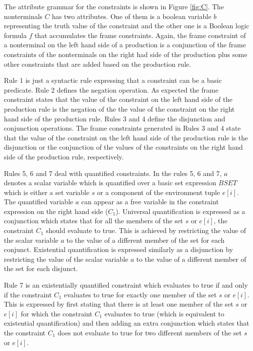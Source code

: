 The attribute grammar for the constraints is shown in
Figure \ref{fig:C}.
The nonterminals $C$ has two attributes.
One of them is a boolean variable $b$ representing
the truth value of the constraint and the other one is a
Boolean logic formula $f$ that accumulates the frame constraints.
Again, the frame constraint of a nonterminal 
on the left hand side of a production
is a conjunction of the frame constraints of the nonterminals
on the right had side of the production plus some other constraints
that are added based on the production rule.

Rule 1 is just a syntactic rule expressing that a constraint can be
a basic predicate.
Rule 2 defines the negation operation. As expected the
frame constraint states that the value of the constraint
on the left hand side of the production rule is the negation of
the the value of the constraint
on the right hand side of the production rule.
Rules 3 and 4 define the disjunction and conjunction operations.
The frame constraints generated in Rules 3 and 4
state that the value of the constraint
on the left hand side of the production rule is the disjunction or
the conjunction of the values of the constraints on the right
hand side of the production rule, respectively.

Rules 5, 6 and 7 deal with quantified constraints.
In the rules 5, 6 and 7, $a$ denotes a scalar variable which is quantified 
over a basic set expression $BSET$ which is either a set variable $s$ or
a component of the environment tuple $e[i]$.
The quantified variable $a$ can appear as a free variable in the constraint
expression on the right hand side ($C_1$).
Universal quantification is expressed as a conjunction which states that
for all the members of the set $s$ or $e[i]$, the constraint $C_1$ should evaluate
to true. This is achieved by restricting the value of the scalar variable $a$
to the value of a different member of the set for each conjunct.
Existential quantification is expressed similarly as a disjunction by 
restricting the value of the scalar variable $a$ to the value of a 
different member of the set for each disjunct.

Rule 7 is an existentially quantified constraint which evaluates to true
if and only if the constraint $C_1$ evaluates to true for exactly one
member of the set $s$ or $e[i]$. This is expressed by first stating
that there is at least one member of the set $s$ or $e[i]$ for which the
constraint $C_1$ evaluates to true (which is equivalent to
existential quantification) and then adding an extra conjunction which
states that the constraint $C_1$ does not evaluate to true for two
different members of the set $s$ or $e[i]$. 

